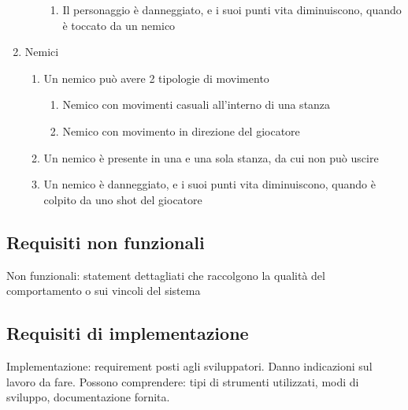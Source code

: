 \begin{enumerate}
\begin{enumerate}
        \begin{enumerate}
            \item Il personaggio è danneggiato, e i suoi punti vita diminuiscono, quando è toccato da un nemico
        \end{enumerate}
    \end{enumerate}
    \item Nemici
    \begin{enumerate}
        \item Un nemico può avere 2 tipologie di movimento
        \begin{enumerate}
            \item Nemico con movimenti casuali all'interno di una stanza
            \item Nemico con movimento in direzione del giocatore
        \end{enumerate}
        \item Un nemico è presente in una e una sola stanza, da cui non può uscire
        \item Un nemico è danneggiato, e i suoi punti vita diminuiscono, quando è colpito da uno shot del giocatore
    \end{enumerate}
\end{enumerate}


\subsection{Requisiti non funzionali}
Non funzionali: statement dettagliati che raccolgono la qualità del 
comportamento o sui vincoli del sistema

\subsection{Requisiti di implementazione}
Implementazione: requirement posti agli sviluppatori. Danno indicazioni 
sul lavoro da fare. Possono comprendere: tipi di strumenti utilizzati, 
modi di sviluppo, documentazione fornita.
